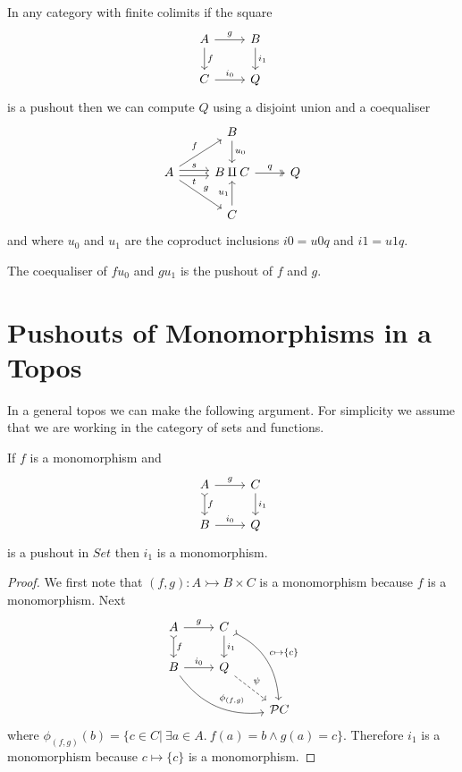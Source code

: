 \documentclass{article}
\begin{document}
In any category with finite colimits if the square
\begin{equation*}
  \begin{tikzcd}
   A \rar{g} \dar{f} & B\dar{i_1}\\
   C \rar{i_0} & Q
  \end{tikzcd}
\end{equation*}
is a pushout then we can compute $Q$ using a disjoint union and a coequaliser
\begin{equation*}
  \begin{tikzcd}
   {} & B \dar{u_0} & {}\\
   A \urar{f} \drar{g} \rar[yshift=0.5ex]{s} \rar[yshift=-0.5ex][swap]{t} & B\amalg C \rar[twoheadrightarrow]{q} & Q\\
   {} & C \uar{u_1} & {}
  \end{tikzcd}
\end{equation*}
and where $u_0$ and $u_1$ are the coproduct inclusions $i0=u0 q$ and $i1= u1 q$.

\begin{proposition}
  The coequaliser of $fu_0$ and $gu_1$ is the pushout of $f$ and $g$.
\end{proposition}

\section{Pushouts of Monomorphisms in a Topos}
\label{sec:pushouts-of-monomorphisms}

In a general topos we can make the following argument.
For simplicity we assume that we are working in the category of sets and functions.

\begin{lemma}\label{lem:pushout-of-mono}
  If $f$ is a monomorphism and
  \begin{equation*}
    \begin{tikzcd}
     A \rar{g} \dar[rightarrowtail]{f} & C\dar{i_1}\\
     B \rar{i_0} & Q
    \end{tikzcd}
  \end{equation*}
  is a pushout in $Set$ then $i_1$ is a monomorphism.
  \begin{proof}
    We first note that $(f,g):A \rightarrowtail B\times C$ is a monomorphism because $f$ is a monomorphism.
    Next
    \begin{equation*}
      \begin{tikzcd}
       A \rar{g} \dar[rightarrowtail]{f} & C\dar{i_1} \arrow[bend left,rightarrowtail]{ddr}{c\mapsto \{c\}} & {}\\
       B \rar{i_0} \arrow[bend right]{rrd}{\phi_{(f,g)}} & Q \drar[dashed]{\psi} & {}\\
       {} & {} & \mathcal P C
      \end{tikzcd}
    \end{equation*}
    where $\phi_{(f,g)}(b)=\{c\in C|~\exists a\in A.~f(a)=b \wedge g(a)=c\}$.
    Therefore $i_1$ is a monomorphism because $c\mapsto \{c\}$ is a monomorphism.
  \end{proof}
\end{lemma}
\end{document}
